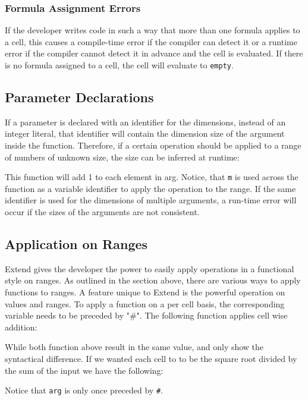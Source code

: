 \subsubsection{Formula Assignment Errors}
If the developer writes code in such a way that more than one formula applies to a cell, this causes a compile-time error if the compiler can detect it or a runtime error if the compiler cannot detect it in advance and the cell is evaluated. If there is no formula assigned to a cell, the cell will evaluate to \texttt{empty}.
\subsection{Parameter Declarations}
If a parameter is declared with an identifier for the dimensions, instead of an integer literal, that identifier will contain the dimension size of the argument inside the function. Therefore, if a certain operation should be applied to a range of numbers of unknown size, the size can be inferred at runtime:

This function will add 1 to each element in arg. Notice, that \texttt{m} is used across the function as a variable identifier to apply the operation to the range. If the same identifier is used for the dimensions of multiple arguments, a run-time error will occur if the sizes of the arguments are not consistent.
\subsection{Application on Ranges}
Extend gives the developer the power to easily apply operations in a functional style on ranges. As outlined in the section above, there are various ways to apply functions to ranges. A feature unique to Extend is the powerful operation on values and ranges. To apply a function on a per cell basis, the corresponding variable needs to be preceded by "\#". The following function applies cell wise addition:

While both function above result in the same value, and only show the syntactical difference. If we wanted each cell to to be the square root divided by the sum of the input we have the following:

Notice that \texttt{arg} is only once preceded by \texttt{\#}.
